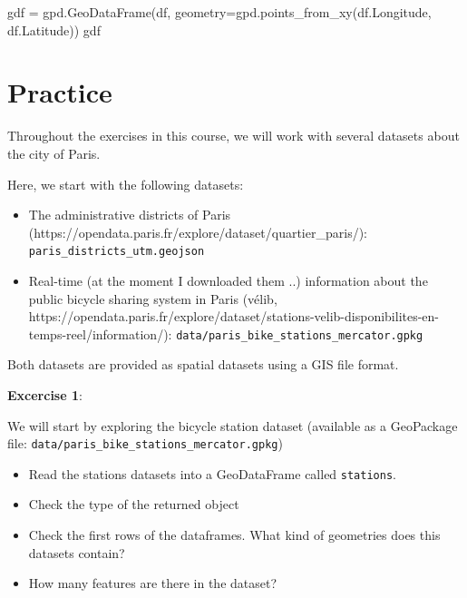 \documentclass[
  letterpaper,
  DIV=11,
  numbers=noendperiod]{scrreprt}
\newenvironment{Shaded}{\begin{snugshade}}{\end{snugshade}}
\newcommand{\NormalTok}[1]{\textcolor[rgb]{0.00,0.23,0.31}{#1}}
\newcommand{\OperatorTok}[1]{\textcolor[rgb]{0.37,0.37,0.37}{#1}}
\providecommand{\tightlist}{%
  \setlength{\itemsep}{0pt}\setlength{\parskip}{0pt}}\usepackage{longtable,booktabs,array}
\begin{document}
\begin{Shaded}
\begin{Highlighting}[]
\NormalTok{gdf }\OperatorTok{=}\NormalTok{ gpd.GeoDataFrame(df, geometry}\OperatorTok{=}\NormalTok{gpd.points\_from\_xy(df.Longitude, df.Latitude))}
\NormalTok{gdf}
\end{Highlighting}
\end{Shaded}


\hypertarget{practice}{%
\chapter{Practice}\label{practice}}

Throughout the exercises in this course, we will work with several
datasets about the city of Paris.

Here, we start with the following datasets:

\begin{itemize}
\tightlist
\item
  The administrative districts of Paris
  (https://opendata.paris.fr/explore/dataset/quartier\_paris/):
  \texttt{paris\_districts\_utm.geojson}
\item
  Real-time (at the moment I downloaded them ..) information about the
  public bicycle sharing system in Paris (vélib,
  https://opendata.paris.fr/explore/dataset/stations-velib-disponibilites-en-temps-reel/information/):
  \texttt{data/paris\_bike\_stations\_mercator.gpkg}
\end{itemize}

Both datasets are provided as spatial datasets using a GIS file format.

\textbf{Excercise 1}:

We will start by exploring the bicycle station dataset (available as a
GeoPackage file: \texttt{data/paris\_bike\_stations\_mercator.gpkg})

\begin{itemize}
\tightlist
\item
  Read the stations datasets into a GeoDataFrame called
  \texttt{stations}.
\item
  Check the type of the returned object
\item
  Check the first rows of the dataframes. What kind of geometries does
  this datasets contain?
\item
  How many features are there in the dataset?
\end{itemize}
\end{document}
